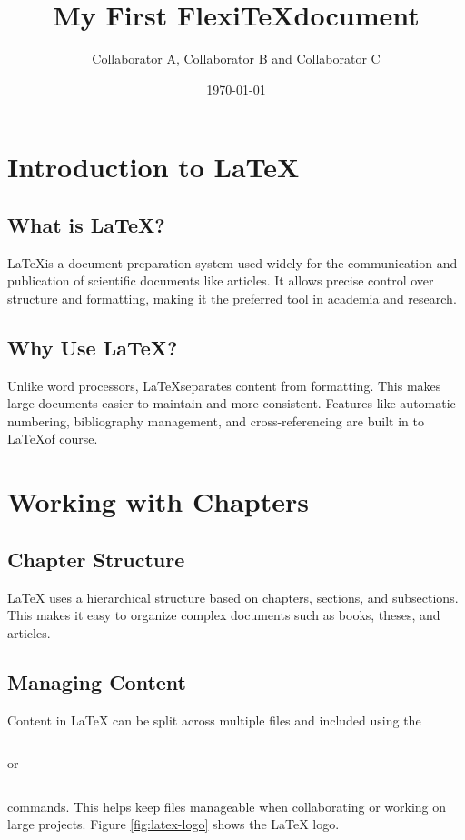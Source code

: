 \documentclass{report}
\title{My First Flexi\TeX document}
\author{Collaborator A, Collaborator B and Collaborator C}
\date{\today}
\begin{document}
\maketitle
\chapter{Introduction to \LaTeX}

\section{What is \LaTeX?}
\LaTeX is a document preparation system used widely for the communication and publication of scientific documents like articles. It allows precise control over structure and formatting, making it the preferred tool in academia and research.

\section{Why Use \LaTeX?}
Unlike word processors, \LaTeX separates content from formatting. This makes large documents easier to maintain and more consistent. Features like automatic numbering, bibliography management, and cross-referencing are built in to \LaTeX of course.

\chapter{Working with Chapters}

\section{Chapter Structure}
LaTeX uses a hierarchical structure based on chapters, sections, and subsections. This makes it easy to organize complex documents such as books, theses, and articles.

\section{Managing Content}
Content in LaTeX can be split across multiple files and included using the

\begin{verbatim}\end{verbatim}
or
\begin{verbatim}\end{verbatim}

commands. This helps keep files manageable when collaborating or working on large projects. Figure \ref{fig:latex-logo} shows the LaTeX logo.
\end{document}

